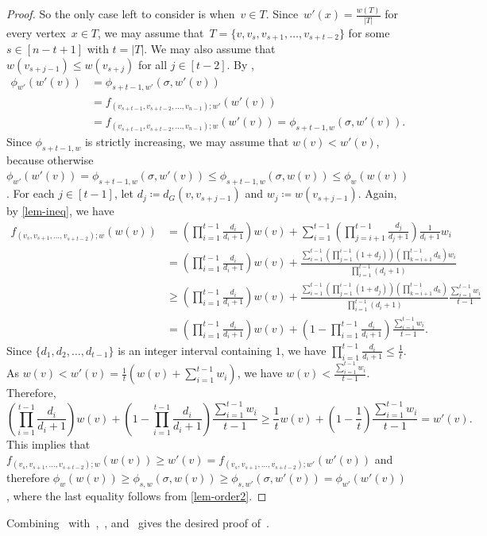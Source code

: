 \documentclass[reqno, 12pt]{amsart}
\numberwithin{equation}{section}
\numberwithin{figure}{section}
\theoremstyle{plain}
\theoremstyle{definition}
\newcommand*{\abs}[1]{\ensuremath{{\left\lvert {#1} \right\rvert}}}
\begin{document}
\begin{proof}
    
    So the only case left to consider is when~${v\in T}$. 
    Since~${w'(x) = \frac{w(T)}{\abs{T}}}$ for every vertex~$x\in T$, we may assume that~${T=\{v,v_s,v_{s+1},\ldots,v_{s+t-2}\}}$ for some~${s \in [n-t+1]}$ with $t=\abs{T}$.
    We may also assume that~${w(v_{s+j-1}) \leq w(v_{s+j})}$ for all $j\in [t-2]$.
    By , 
    \begin{align*}
        \phi_{w'}(w'(v)) 
        &= \phi_{s+t-1, w'}(\sigma, w'(v)) \\
        &= f_{(v_{s+t-1},v_{s+t-2},\ldots,v_{n-1});w'}(w'(v)) \\
        &= f_{(v_{s+t-1},v_{s+t-2},\ldots,v_{n-1});w}(w'(v))
        =\phi_{s+t-1,w}(\sigma,w'(v)).
    \end{align*}
    Since $\phi_{s+t-1,w}$ is strictly increasing, we may assume that $w(v)<w'(v)$, because otherwise $\phi_{w'}(w'(v))= \phi_{s+t-1,w}(\sigma,w'(v))\le \phi_{s+t-1,w}(\sigma,w(v))\le \phi_w(w(v))$.
    For each $j\in [t-1]$, let $d_j\coloneqq d_G(v,v_{s+j-1})$ and $w_j\coloneqq w(v_{s+j-1})$.
    Again, by \cref{lem-ineq}, we have 
    \begin{align*}
        f_{(v_s, v_{s+1},\ldots,v_{s+t-2});w}(w(v)) 
        &= \left(\prod_{i=1}^{t-1}\frac{d_i}{d_i+1} \right)w(v) 
        + \sum_{i=1}^{t-1} \left(\prod_{j=i+1}^{t-1} \frac{d_j}{d_j+1} \right)\frac{1}{d_i+1} w_i\\
        &=\left(\prod \limits_{i=1}^{t-1}\frac{d_i}{d_i+1} \right)w(v)
        + \frac{
        \sum \limits_{i=1}^{t-1} \left(\prod \limits_{j=1}^{i-1}(1+d_j)\right)\left(\prod \limits_{k=i+1}^{t-1} d_k \right) w_i }
        {\prod\limits_{i=1}^{t-1} (d_i+1)}\\
        &\geq \left(\prod_{i=1}^{t-1}\frac{d_i}{d_i+1} \right)w(v) 
        +  \frac{
        \sum \limits_{i=1}^{t-1} \left(\prod \limits_{j=1}^{i-1}(1+d_j)\right)\left(\prod \limits_{k=i+1}^{t-1} d_k \right) }
        {\prod \limits_{i=1}^{t-1} (d_i+1)}\frac{\sum \limits_{i=1}^{t-1} w_i}{t-1} \\
        &=  \left(\prod\limits_{i=1}^{t-1}\frac{d_i}{d_i+1} \right)w(v) 
        +  \left(1-\prod\limits_{i=1}^{t-1}\frac{d_i}{d_i+1} \right)
        \frac{\sum\limits_{i=1}^{t-1} w_i}{t-1}.
    \end{align*}
    Since $\{d_1,d_2,\ldots,d_{t-1}\}$ is an integer interval containing $1$,  we have 
    $\prod_{i=1}^{t-1}\frac{d_i}{d_i+1} \le \frac{1}{t}$.
    As $w(v)<w'(v)=
    \frac1t (w(v)+\sum_{i=1}^{t-1} w_i)$, we have $w(v)<\frac{\sum_{i=1}^{t-1}w_i}{t-1}$.
    Therefore, 
    \[ 
        \left(\prod_{i=1}^{t-1}\frac{d_i}{d_i+1} \right)w(v) 
        +  \left(1-\prod_{i=1}^{t-1}\frac{d_i}{d_i+1} \right)
        \frac{\sum \limits_{i=1}^{t-1} w_i}{t-1}
        \geq \frac{1}{t} w(v)+ \left(1-\frac1t\right) \frac{\sum \limits_{i=1}^{t-1} w_i}{t-1} = w'(v).
    \] 
    This implies that $f_{(v_s, v_{s+1},\ldots,v_{s+t-2});w}(w(v)) \geq w'(v) = f_{(v_s, v_{s+1},\ldots,v_{s+t-2});w'}(w'(v))$ and therefore 
    $\phi_w(w(v))\ge \phi_{s,w}(\sigma,w(v))\ge \phi_{s,w'}(\sigma,w'(v))=\phi_{w'}(w'(v))$, 
    where the last equality follows from \cref{lem-order2}.
\end{proof}
\color{black}

Combining~ with~,~, and~ gives the desired proof of~.
\end{document}
